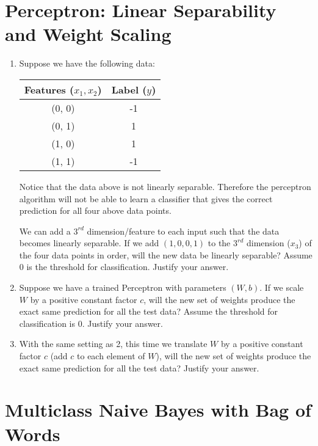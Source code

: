 \documentclass[12pt, letterpaper]{article}
\begin{document}
\section{Perceptron: Linear Separability and Weight Scaling}
\begin{enumerate}[label=\alph*.]
\item Suppose we have the following data:

\begin{center}
\begin{tabular}{ |c|c| } 
\hline
Features ($x_1, x_2$) & Label ($y$) \\
\hline
(0, 0) & -1 \\ 
(0, 1) & 1 \\ 
(1, 0) & 1 \\ 
(1, 1) & -1 \\ 
\hline
\end{tabular}
\end{center}

Notice that the data above is not linearly separable. Therefore the perceptron algorithm will not be able to learn a classifier that gives the correct prediction for all four above data points.

We can add a $3^{rd}$ dimension/feature to each input such that the data becomes linearly separable. If we add $(1, 0, 0, 1)$ to the $3^{rd}$ dimension ($x_3$) of the four data points in order, will the new data be linearly separable? Assume 0 is the threshold for classification. Justify your answer.


\bigskip

\item Suppose we have a trained Perceptron with parameters $(W, b)$. If we scale $W$ by a positive constant factor $c$, will the new set of weights produce the exact same prediction for all the test data? Assume the threshold for classification is 0. Justify your answer.

\bigskip

\item With the same setting as 2, this time we translate $W$ by a positive constant factor $c$ (add $c$ to each element of $W$), will the new set of weights produce the exact same prediction for all the test data? Justify your answer.

\end{enumerate}

\bigskip
\section{Multiclass Naive Bayes with Bag of Words}
\end{document}
